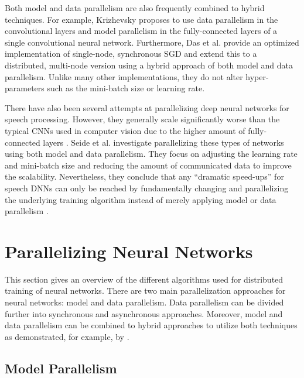 \documentclass[conference,compsoc,a4paper]{IEEEtran}
\begin{document}
Both model and data parallelism are also frequently combined to hybrid techniques.
For example, Krizhevsky \cite{krizhevsky2014-One-weird-trick} proposes to use data parallelism in the convolutional layers and model parallelism in the fully-connected layers of a single convolutional neural network.
%
Furthermore, Das et al. \cite{das2016-Distributed-deep-learning} provide an optimized implementation of single-node, synchronous SGD and extend this to a distributed, multi-node version using a hybrid approach of both model and data parallelism.
Unlike many other implementations, they do not alter hyper-parameters such as the mini-batch size or learning rate.

There have also been several attempts at parallelizing deep neural networks for speech processing.
However, they generally scale significantly worse than the typical CNNs used in computer vision due to the higher amount of fully-connected layers \cite{dean2012-Large-scale-distributed,seide2014-Speech-DNNs}.
Seide et al. \cite{seide2014-Speech-DNNs,seide2014-1-bit-stochastic} investigate parallelizing these types of networks using both model and data parallelism.
They focus on adjusting the learning rate and mini-batch size \cite{seide2014-Speech-DNNs} and reducing the amount of communicated data \cite{seide2014-1-bit-stochastic} to improve the scalability.
Nevertheless, they conclude that any ``dramatic speed-ups'' for speech DNNs can only be reached by fundamentally changing and parallelizing the underlying training algorithm instead of merely applying model or data parallelism \cite{seide2014-Speech-DNNs,seide2014-1-bit-stochastic}.


\section{Parallelizing Neural Networks} %
\label{sec:parallelizing_neural_networks}
This section gives an overview of the different algorithms used for distributed training of neural networks.
There are two main parallelization approaches for neural networks: model and data parallelism.
Data parallelism can be divided further into synchronous and asynchronous approaches.
Moreover, model and data parallelism can be combined to hybrid approaches to utilize both techniques as demonstrated, for example, by \cite{krizhevsky2014-One-weird-trick,das2016-Distributed-deep-learning}.

\subsection{Model Parallelism} %
\label{sub:model_parallelism}
\end{document}
